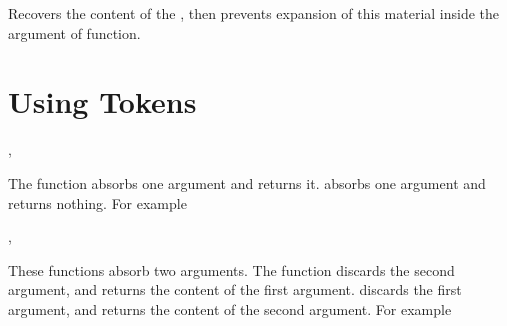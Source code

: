 \documentclass[oneside]{book}
\let\tn=\cs
\begin{document}
\begin{function}{\OnlyValue}
\begin{syntax}
 
\end{syntax}
Recovers the content of the , then prevents expansion
of this material inside the argument of  function.
\end{function}

\section{Using Tokens}

\begin{function}{\UseOne,\GobbleOne}
\begin{syntax}
 
 
\end{syntax}
The function  absorbs one argument and returns it.
 absorbs one argument and returns nothing.
For example
\begin{demohigh}
\end{demohigh}
\end{function}

\begin{function}{\UseGobble,\GobbleUse}
\begin{syntax}
  
  
\end{syntax}
These functions absorb two arguments.
The function  discards the second argument,
and returns the content of the first argument.
 discards the first argument,
and returns the content of the second argument.
For example
\begin{demohigh}
\end{demohigh}
\end{function}
\end{document}
